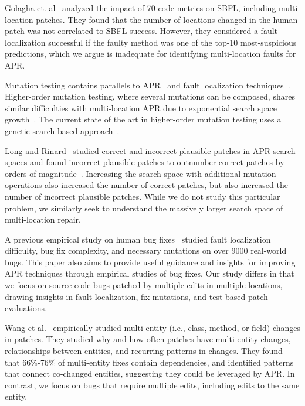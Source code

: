 \documentclass[10pt,journal,compsoc]{IEEEtran}
\begin{document}
Golagha et. al~\cite{golagha2020can} analyzed the impact of 70 code metrics on
SBFL, including multi-location patches.  They found that the number of locations
changed in the human patch was not correlated to SBFL success.  However, they
considered a fault localization successful if the faulty method was one of the
top-10 most-suspicious predictions, which we argue is inadequate for
identifying multi-location faults for APR.

Mutation testing contains parallels to APR~\cite{weimer2013leveraging} and fault
localization techniques~\cite{metallaxis,muse,mbfl-survey}. Higher-order
mutation testing, where several mutations can be composed, shares similar
difficulties with multi-location APR due to exponential search space
growth~\cite{long-search-spaces}. The current state of the art in higher-order
mutation testing uses a genetic search-based approach~\cite{homs}.

Long and Rinard~\cite{long-search-spaces} studied correct and incorrect
plausible patches in APR search spaces and found incorrect plausible patches to
outnumber correct patches by orders of magnitude~\cite{spr, prophet}. Increasing
the search space with additional mutation operations also increased the number
of correct patches, but also increased the number of incorrect plausible
patches.  While we do not study this particular problem, we similarly seek to
understand the massively larger search space of multi-location repair.

A previous empirical study on human bug fixes~\cite{zhong2015} studied fault
localization difficulty, bug fix complexity, and necessary mutations on over
9000 real-world bugs. This paper also aims to provide useful guidance and
insights for improving APR techniques through empirical studies
of bug fixes. Our study differs in that we focus on source code bugs
patched by multiple edits in multiple locations, drawing insights in fault
localization, fix mutations, and test-based patch evaluations.

Wang et al.~\cite{wang2018} empirically studied multi-entity (i.e., class,
method, or field) changes in patches. They studied why and how often patches
have multi-entity changes, relationships between entities, and recurring
patterns in changes.  They found that 66\%-76\% of multi-entity fixes contain
dependencies, and identified patterns that connect co-changed entities,
suggesting they could be leveraged by APR. In contrast, we focus on bugs
that require multiple edits, including edits to the same entity.
\end{document}
